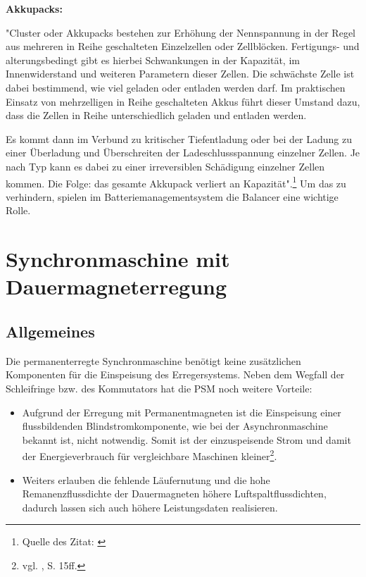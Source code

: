 \textbf{Akkupacks:}

"Cluster oder Akkupacks bestehen zur Erhöhung der Nennspannung in der Regel aus mehreren in Reihe geschalteten Einzelzellen oder Zellblöcken. Fertigungs- und alterungsbedingt gibt es hierbei Schwankungen in der Kapazität, im Innenwiderstand und weiteren Parametern dieser Zellen. Die schwächste Zelle ist dabei bestimmend, wie viel geladen oder entladen werden darf. Im praktischen Einsatz von mehrzelligen in Reihe geschalteten Akkus führt dieser Umstand dazu, dass die Zellen in Reihe unterschiedlich geladen und entladen werden.

Es kommt dann im Verbund zu kritischer Tiefentladung oder bei der Ladung zu einer Überladung und Überschreiten der Ladeschlussspannung einzelner Zellen. Je nach Typ kann es dabei zu einer irreversiblen Schädigung einzelner Zellen kommen. Die Folge: das gesamte Akkupack verliert an Kapazität".\footnote{Quelle des Zitat: \cite{BalancingderPacks}}
Um das zu verhindern, spielen im Batteriemanagementsystem die Balancer eine wichtige Rolle.

\newpage


\section{Synchronmaschine mit Dauermagneterregung}
\subsection{Allgemeines}
Die permanenterregte Synchronmaschine benötigt keine zusätzlichen Komponenten für die Einspeisung des Erregersystems. Neben dem Wegfall der Schleifringe bzw. des Kommutators hat die PSM noch weitere Vorteile:
\\[5mm]
\begin{itemize}
	\item Aufgrund der Erregung mit Permanentmagneten ist die Einspeisung einer flussbildenden Blindstromkomponente, wie bei der Asynchronmaschine bekannt ist, nicht notwendig. Somit ist der einzuspeisende Strom und damit der Energieverbrauch für vergleichbare Maschinen kleiner\footnote{vgl. \cite{Dissertation}, S. 15ff.}. \\[3mm]
	\item Weiters erlauben die fehlende Läufernutung und die hohe Remanenzflussdichte der Dauermagneten höhere Luftspaltflussdichten, dadurch lassen sich auch höhere Leistungsdaten realisieren. \\[3mm]
\end{itemize}

